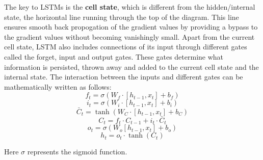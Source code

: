 \documentclass[letterpaper, 10 pt, conference]{ieeeconf}  %
\begin{document}
The key to LSTMs is the \textbf{cell state}, which is different from the hidden/internal state, the horizontal line running through the top of the diagram. This line ensures smooth back propogation of the gradient values by providing a bypass to the gradient values without becoming vanishingly small. Apart from the current cell state, LSTM also includes connections of its input through different gates called the forget, input and output gates. These gates determine what information is persisted, thrown away and added to the current cell state and the internal state. The interaction between the inputs and different gates can be mathematically written as follows:
\begin{equation}
f_{t} = \sigma(W_f\cdot[h_{t-1}, x_t] + b_f)
\end{equation}
\begin{equation}
i_{t} = \sigma(W_i\cdot[h_{t-1}, x_t] + b_i)
\end{equation}
\begin{equation}
\bar{C}_t = \tanh(W_C\cdot[h_{t-1}, x_t] + b_C)
\end{equation}
\begin{equation}
C_t = f_t \cdot C_{t-1} + i_t \cdot \bar{C}_t
\end{equation}
\begin{equation}
o_t = \sigma(W_o[h_{t-1}, x_t] + b_o)
\end{equation}
\begin{equation}
h_t = o_t \cdot \tanh(C_t)
\end{equation}


Here $\sigma$ represents the sigmoid function. %

\end{document}
